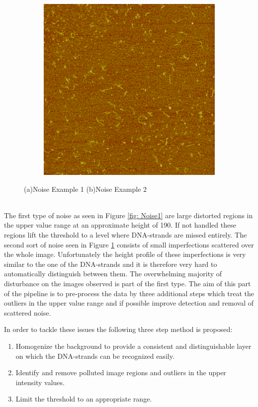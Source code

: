 \documentclass{article}
\begin{document}
\begin{figure}[!htb]
\begin{subfigure}{0.5\textwidth}
		\includegraphics[width=\linewidth]{noise2.png}
		\caption{}
		\label{fig: Noise2}
	\end{subfigure}%
	\caption{(a)Noise Example 1 (b)Noise Example 2}\label{fig:Noise1Noise2}
\end{figure}
\\
The first type of noise as seen in Figure \ref{fig: Noise1} are large distorted regions in the upper value range at an approximate height of 190. If not handled these regions lift the threshold to a level where DNA-strands are missed entirely. 
The second sort of noise seen in Figure \ref{fig: Noise2} consists of small imperfections scattered over the whole image.
Unfortunately the height profile of these imperfections is very similar to the one of the DNA-strands and it is therefore very hard to automatically distinguish between them.
The overwhelming majority of disturbance on the images observed is part of the first type.
The aim of this part of the pipeline is to pre-process the data by three additional steps which treat the outliers in the upper value range and if possible improve detection and removal of scattered noise.

In order to tackle these issues the following three step method is proposed:
\begin{enumerate}
	\item Homogenize the background to provide a consistent and distinguishable layer on which the DNA-strands can be recognized easily.
	\item Identify and remove polluted image regions and outliers in the upper intensity values.
	\item Limit the threshold to an appropriate range.
\end{enumerate}
\end{document}
